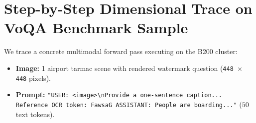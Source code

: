 \documentclass[11pt, a4paper]{article}
\begin{document}
\newpage
\section{Step-by-Step Dimensional Trace on VoQA Benchmark Sample}
We trace a concrete multimodal forward pass executing on the B200 cluster:
\begin{itemize}
    \item \textbf{Image:} 1 airport tarmac scene with rendered watermark question (\texttt{448 $\times$ 448} pixels).
    \item \textbf{Prompt:} \texttt{"USER: <image>\textbackslash nProvide a one-sentence caption... Reference OCR token: FawsaG ASSISTANT: People are boarding..."} ($50$ text tokens).
\end{itemize}
\end{document}
